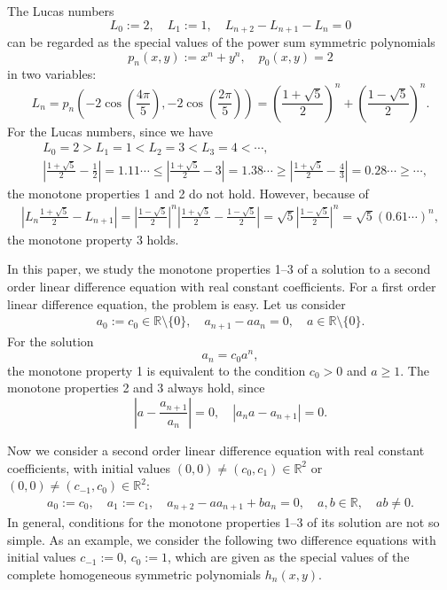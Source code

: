 \documentclass[a4paper,11pt,reqno]{amsart}
\theoremstyle{plain}
\theoremstyle{definition}
\begin{document}
The Lucas numbers
$$
L_{0}:=2, \quad L_{1}:=1, \quad L_{n+2}-L_{n+1}-L_{n}=0
$$
can be regarded as the special values of the power sum symmetric polynomials 
$$
p_{n}(x,y)
   :=
   x^{n}+y^{n}, \quad 
   p_{0}(x,y)=2
$$
in two variables: 
$$
L_{n}
   =
   p_{n}\left(-2\cos{\left(\frac{4\pi }{5}\right)}, -2\cos{\left(\frac{2\pi }{5}\right)}\right)
   =
   \left(\frac{1+\sqrt{5}}{2}\right)^{n}+\left(\frac{1-\sqrt{5}}{2}\right)^{n} .
$$
For the Lucas numbers, since we have 
\begin{align*}
& L_{0}=2 > L_{1}=1 < L_{2}=3 < L_{3}=4 < \cdots , \\
& \left|\frac{1+\sqrt{5}}{2}-\frac{1}{2}\right|=1.11\cdots 
   \leq \left|\frac{1+\sqrt{5}}{2}-3\right|=1.38\cdots 
   \geq \left|\frac{1+\sqrt{5}}{2}-\frac{4}{3}\right|=0.28\cdots 
   \geq \cdots ,
\end{align*}
the monotone properties 1 and 2 do not hold. 
However, because of 
\begin{align*}
\left|L_{n}\frac{1+\sqrt{5}}{2}-L_{n+1}\right|
   =
   \left|\frac{1-\sqrt{5}}{2}\right|^{n}
   \left|\frac{1+\sqrt{5}}{2}-\frac{1-\sqrt{5}}{2}\right|
   =
   \sqrt{5}
   \left|\frac{1-\sqrt{5}}{2}\right|^{n}
   =
   \sqrt{5}
   (0.61\cdots )^{n} ,
\end{align*}
the monotone property 3 holds. 

In this paper, we study the monotone properties 1--3 of a solution to 
a second order linear difference equation with real constant coefficients. 
For a first order linear difference equation, the problem is easy. 
Let us consider
\begin{align*}
a_{0}:=c_{0}\in \mathbb{R}\setminus \{0\}, \quad  
a_{n+1}-aa_{n}=0 ,\quad a \in \mathbb{R}\setminus \{0\} .
\end{align*}
For the solution 
$$
a_{n}=c_{0}a^{n},
$$
the monotone property 1
is equivalent to the condition $c_{0}>0$ and $a\geq 1$. 
The monotone properties 2 and 3 always hold, since 
$$
\left|a-\frac{a_{n+1}}{a_{n}}\right|
   =
   0, \quad 
\left|a_{n}a-a_{n+1}\right|=0 .
$$

Now we consider 
a second order linear difference equation with real constant coefficients, 
with initial values $(0,0)\not= (c_{0},c_{1})\in \mathbb{R}^{2}$ or $(0,0)\not=(c_{-1},c_{0}) \in \mathbb{R}^{2}$: 
\begin{align}
\label{eq:two order diff eq}
a_{0}:=c_{0}, \quad a_{1}:=c_{1}, \quad 
a_{n+2}-aa_{n+1}+ba_{n}=0, \quad a,b \in \mathbb{R}, \quad ab\not=0 .
\end{align}
In general, conditions for 
the monotone properties 1--3 of its solution are not so simple. 
As an example, we consider the following two difference equations with initial values $c_{-1}:=0$, $c_{0}:=1$, 
which are given as the special values of the complete homogeneous symmetric polynomials $h_{n}(x,y)$. 
\end{document}
